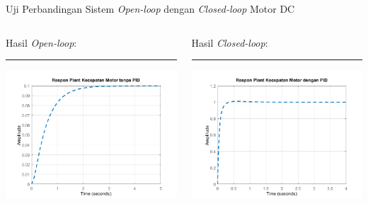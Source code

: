 \documentclass[10pt,xcolor={dvipsnames}]{beamer}
\begin{document}
\begin{frame}{Uji Perbandingan Sistem \textit{Open-loop} dengan \textit{Closed-loop} Motor DC}
	\begin{columns}[T] %
		\begin{column}{0.48\textwidth}
			Hasil \textit{Open-loop}:\newline
			\color{black}\rule{\linewidth}{4pt}
			\includegraphics[width=7.5cm]{Matlab/olDCSpeed.png}
		\end{column}%
		\hfill%
		\begin{column}{0.48\textwidth}
			Hasil \textit{Closed-loop}:\newline
			\color{blue}\rule{\linewidth}{4pt}
				\includegraphics[width=7.5cm]{Matlab/clDCSpeed.png}
		\end{column}
	\end{columns}
\end{frame}
\end{document}
